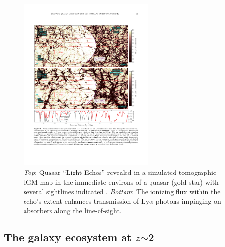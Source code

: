 \begin{figure}
%
\includegraphics[width=0.6\textwidth]{figs/qso_LightEcho_v1.pdf}
%
\caption{{\it Top}: Quasar ``Light Echos'' revealed in a simulated
tomographic IGM map in the immediate environs of a quasar (gold star)
with several sightlines indicated
\citep[from][]{2018arXiv181005156S}. {\it Bottom}: The ionizing flux
within the echo's extent enhances transmission of Ly$\alpha$ photons
impinging on absorbers along the line-of-sight.}
\label{fig:LightEcho}
\end{figure}


\subsection{The galaxy ecosystem at $z$$\sim$2}
\label{sec:z2galaxies}

